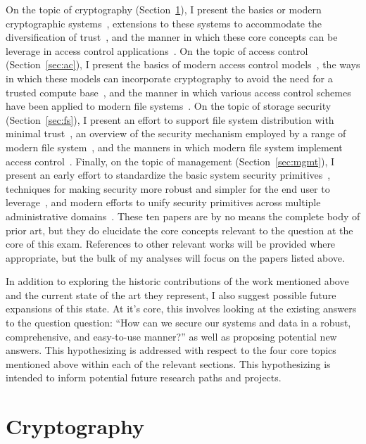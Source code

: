 \documentclass{sig-alternate}
\begin{document}
On the topic of cryptography (Section~\ref{sec:crypto}), I present the
basics or modern cryptographic systems~\cite{Diffie1976}, extensions
to these systems to accommodate the diversification of
trust~\cite{Shamir1979}, and the manner in which these core concepts
can be leverage in access control
applications~\cite{Bethencourt2007}. On the topic of access control
(Section~\ref{sec:ac}), I present the basics of modern access control
models~\cite{Sandhu1996}, the ways in which these models can
incorporate cryptography to avoid the need for a trusted compute
base~\cite{Bethencourt2007}, and the manner in which various access
control schemes have been applied to modern file
systems~\cite{Miltchev2008}. On the topic of storage security
(Section~\ref{sec:fs}), I present an effort to support file system
distribution with minimal trust~\cite{Mazieres1999}, an overview of
the security mechanism employed by a range of modern file
system~\cite{Kher2005}, and the manners in which modern file system
implement access control~\cite{Miltchev2008}. Finally, on the topic of
management (Section~\ref{sec:mgmt}), I present an early effort to
standardize the basic system security primitives~\cite{Samar1996},
techniques for making security more robust and simpler for the end
user to leverage~\cite{Cox2002}, and modern efforts to unify security
primitives across multiple administrative
domains~\cite{Morgan2004}. These ten papers are by no means the
complete body of prior art, but they do elucidate the core concepts
relevant to the question at the core of this exam. References to other
relevant works will be provided where appropriate, but the bulk of my
analyses will focus on the papers listed above.

In addition to exploring the historic contributions of the work
mentioned above and the current state of the art they represent, I
also suggest possible future expansions of this state. At it's core,
this involves looking at the existing answers to the question
question: ``How can we secure our systems and data in a robust,
comprehensive, and easy-to-use manner?'' as well as proposing
potential new answers. This hypothesizing is addressed with respect to
the four core topics mentioned above within each of the relevant
sections. This hypothesizing is intended to inform potential future
research paths and projects.

\section{Cryptography}
\label{sec:crypto}
\end{document}
